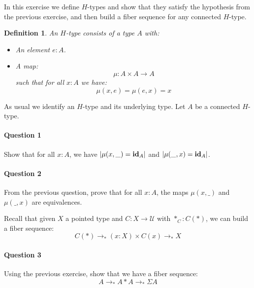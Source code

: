 \documentclass{article}[6pt]%
\newcommand{\U}{{\mathcal U}}
\renewcommand{\r}{\rightarrow}
\newcommand{\id}{\mathrm{\bf id}}
\newtheorem{definition}{Definition}
\begin{document}
\begin{Exercise}[title={$H$-types}]

In this exercise we define $H$-types and show that they satisfy the hypothesis from the previous exercise, and then build a fiber sequence for any connected $H$-type.

\begin{definition}
An $H$-type consists of a type $A$ with:
\begin{itemize}
\item An element $e:A$.
\item A map: 
\[\mu : A\times A \r A\] 
such that for all $x:A$ we have:
\[\mu(x,e) = \mu(e,x)= x\]
\end{itemize} 
\end{definition}

As usual we identify an $H$-type and its underlying type. Let $A$ be a connected $H$-type.

\paragraph{Question 1} Show that for all $x:A$, we have $|\mu(x,\_) = \id_A|$ and $|\mu(\_,x) = \id_A|$.

\paragraph{Question 2} From the previous question, prove that for all $x:A$, the maps $\mu(x,\_)$ and $\mu(\_,x)$ are equivalences.

\vspace{0.4cm}

Recall that given $X$ a pointed type and $C:X\r \U$ with $*_C:C(*)$, we can build a fiber sequence:
\[C(*) \r_* (x:X)\times C(x) \r_* X\]

\paragraph{Question 3} Using the previous exercise, show that we have a fiber sequence:
\[A\r_* A\ast A\r_*\Sigma A\] 

\end{Exercise}
\end{document}
